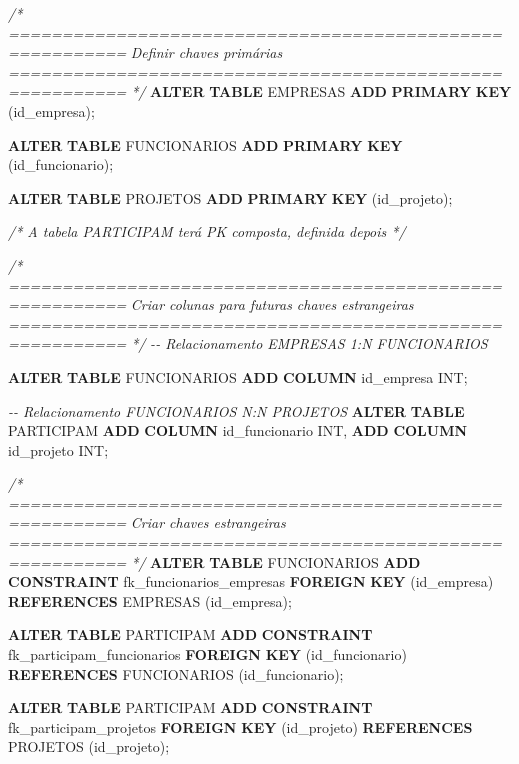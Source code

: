 \documentclass[
]{book}
\newenvironment{Shaded}{\begin{snugshade}}{\end{snugshade}}
\newcommand{\CommentTok}[1]{\textcolor[rgb]{0.56,0.35,0.01}{\textit{#1}}}
\newcommand{\DataTypeTok}[1]{\textcolor[rgb]{0.13,0.29,0.53}{#1}}
\newcommand{\KeywordTok}[1]{\textcolor[rgb]{0.13,0.29,0.53}{\textbf{#1}}}
\newcommand{\NormalTok}[1]{#1}
\begin{document}
\begin{Shaded}
\begin{Highlighting}[]
\CommentTok{/* =========================================================}
\CommentTok{   Definir chaves primárias}
\CommentTok{   ========================================================= */}
\KeywordTok{ALTER} \KeywordTok{TABLE}\NormalTok{ EMPRESAS }\KeywordTok{ADD} \KeywordTok{PRIMARY} \KeywordTok{KEY}\NormalTok{ (id\_empresa);}

\KeywordTok{ALTER} \KeywordTok{TABLE}\NormalTok{ FUNCIONARIOS }\KeywordTok{ADD} \KeywordTok{PRIMARY} \KeywordTok{KEY}\NormalTok{ (id\_funcionario);}

\KeywordTok{ALTER} \KeywordTok{TABLE}\NormalTok{ PROJETOS }\KeywordTok{ADD} \KeywordTok{PRIMARY} \KeywordTok{KEY}\NormalTok{ (id\_projeto);}

\CommentTok{/* A tabela PARTICIPAM terá PK composta, definida depois */}

\CommentTok{/* =========================================================}
\CommentTok{   Criar colunas para futuras chaves estrangeiras}
\CommentTok{   ========================================================= */}
\CommentTok{{-}{-} Relacionamento EMPRESAS 1:N FUNCIONARIOS}

\KeywordTok{ALTER} \KeywordTok{TABLE}\NormalTok{ FUNCIONARIOS  }\KeywordTok{ADD} \KeywordTok{COLUMN}\NormalTok{ id\_empresa }\DataTypeTok{INT}\NormalTok{;}

\CommentTok{{-}{-} Relacionamento FUNCIONARIOS N:N PROJETOS}
\KeywordTok{ALTER} \KeywordTok{TABLE}\NormalTok{ PARTICIPAM }\KeywordTok{ADD} \KeywordTok{COLUMN}\NormalTok{ id\_funcionario }\DataTypeTok{INT}\NormalTok{, }\KeywordTok{ADD} \KeywordTok{COLUMN}\NormalTok{ id\_projeto }\DataTypeTok{INT}\NormalTok{;}

\CommentTok{/* =========================================================}
\CommentTok{   Criar chaves estrangeiras}
\CommentTok{   ========================================================= */}
\KeywordTok{ALTER} \KeywordTok{TABLE}\NormalTok{ FUNCIONARIOS }\KeywordTok{ADD} \KeywordTok{CONSTRAINT}\NormalTok{ fk\_funcionarios\_empresas }\KeywordTok{FOREIGN} \KeywordTok{KEY}\NormalTok{ (id\_empresa) }\KeywordTok{REFERENCES}\NormalTok{ EMPRESAS (id\_empresa);}

\KeywordTok{ALTER} \KeywordTok{TABLE}\NormalTok{ PARTICIPAM }\KeywordTok{ADD} \KeywordTok{CONSTRAINT}\NormalTok{ fk\_participam\_funcionarios }\KeywordTok{FOREIGN} \KeywordTok{KEY}\NormalTok{ (id\_funcionario) }\KeywordTok{REFERENCES}\NormalTok{ FUNCIONARIOS (id\_funcionario);}

\KeywordTok{ALTER} \KeywordTok{TABLE}\NormalTok{ PARTICIPAM }\KeywordTok{ADD} \KeywordTok{CONSTRAINT}\NormalTok{ fk\_participam\_projetos }\KeywordTok{FOREIGN} \KeywordTok{KEY}\NormalTok{ (id\_projeto) }\KeywordTok{REFERENCES}\NormalTok{ PROJETOS (id\_projeto);}


\end{Highlighting}
\end{Shaded}
\end{document}
